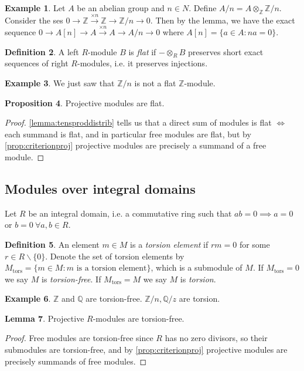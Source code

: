 \documentclass{article}
\newcommand{\Z}{\mathbb{Z}}
\newcommand{\Q}{\mathbb{Q}}
\newcommand{\tors}{{\operatorname{tors}}}
\theoremstyle{definition}
\newtheorem{defn}{Definition}[subsection]
\newtheorem{prop}[defn]{Proposition}
\newtheorem{lemma}[defn]{Lemma}
\newtheorem{example}[defn]{Example}
\begin{document}
\begin{example}
Let $A$ be an abelian group and $n\in N$. Define $A/n=A\otimes_\Z\Z/n$. Consider the ses $0\rightarrow\Z\xrightarrow{\times n}\Z\rightarrow\Z/n\rightarrow 0$. Then by the lemma, we have the exact sequence $0\rightarrow A[n]\rightarrow A\xrightarrow{\times n}A\rightarrow A/n\rightarrow 0$ where $A[n]=\{a\in A:na=0\}$.
\end{example}

\begin{defn}
A left $R$-module $B$ is \textit{flat} if $-\otimes_RB$ preserves short exact sequences of right $R$-modules, i.e. it preserves injections.
\end{defn}
\begin{example}
We just saw that $\Z/n$ is not a flat $\Z$-module.
\end{example}

\begin{prop}
Projective modules are flat.
\end{prop}
\begin{proof}
\ref{lemma:tensproddistrib} tells us that a direct sum of modules is flat $\iff$ each summand is flat, and in particular free modules are flat, but by \ref{prop:criterionproj} projective modules are precisely a summand of a free module.
\end{proof}

\subsection{Modules over integral domains}
Let $R$ be an integral domain, i.e. a commutative ring such that $ab=0\implies a=0$ or $b=0 \ \forall a,b\in R$.

\begin{defn}
An element $m\in M$ is a \textit{torsion element} if $rm=0$ for some $r\in R\backslash\{0\}$. Denote the set of torsion elements by $M_\tors=\{m\in M:m\text{ is a torsion element}\}$, which is a submodule of $M$. If $M_\tors=0$ we say $M$ is \textit{torsion-free}. If $M_\tors=M$ we say $M$ is \textit{torsion}.
\end{defn}

\begin{example}
$\Z$ and $\Q$ are torsion-free. $\Z/n,\Q/z$ are torsion.
\end{example}

\begin{lemma}
Projective $R$-modules are torsion-free.
\end{lemma}
\begin{proof}
Free modules are torsion-free since $R$ has no zero divisors, so their submodules are torsion-free, and by \ref{prop:criterionproj} projective modules are precisely summands of free modules.
\end{proof}
\end{document}
